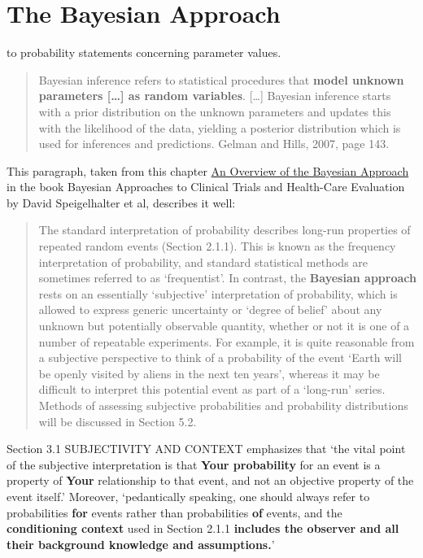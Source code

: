 \documentclass[]{book}
\begin{document}
\hypertarget{the-bayesian-approach}{%
\section{The Bayesian Approach}\label{the-bayesian-approach}}

to probability statements concerning parameter values.

\begin{quote}
Bayesian inference refers to statistical procedures that \textbf{model unknown parameters {[}\ldots{}{]} as random variables}. {[}\ldots{}{]} Bayesian inference starts with a prior distribution on the unknown parameters and updates this with the likelihood of the data, yielding a posterior distribution which is used for inferences and predictions. Gelman and Hills, 2007, page 143.
\end{quote}

This paragraph, taken from this chapter
\href{http://www.medicine.mcgill.ca/epidemiology/hanley/bios601/ch10Bayes/an\%20overview\%20of\%20the\%20Bayesian\%20approach.pdf}{An Overview of the Bayesian Approach}
in the book Bayesian Approaches to Clinical Trials and Health-Care Evaluation by David Speigelhalter et al, describes it well:

\begin{quote}
The standard interpretation of probability describes long-run properties of repeated random events (Section 2.1.1). This is known as the frequency interpretation of probability, and standard statistical methods are sometimes referred to as `frequentist'. In contrast, the \textbf{Bayesian approach} rests on an essentially `subjective' interpretation of probability, which is allowed to express generic uncertainty or `degree of belief' about any unknown but potentially observable quantity, whether or not it is one of a number of repeatable experiments. For example, it is quite reasonable from a subjective perspective to think of a probability of the event `Earth will be openly visited by aliens in the next ten years', whereas it may be difficult to interpret this potential event as part of a `long-run' series. Methods of assessing subjective probabilities and probability distributions will be discussed in Section 5.2.
\end{quote}

Section 3.1 SUBJECTIVITY AND CONTEXT emphasizes that
`the vital point of the subjective interpretation is that \textbf{Your probability} for an event is a property of \textbf{Your} relationship to that event, and not an objective property of the event itself.' Moreover, `pedantically speaking, one should always refer to probabilities \textbf{for} events rather than probabilities \textbf{of} events, and the \textbf{conditioning context} used in Section 2.1.1 \textbf{includes the observer and all their background knowledge and assumptions.}'
\end{document}
